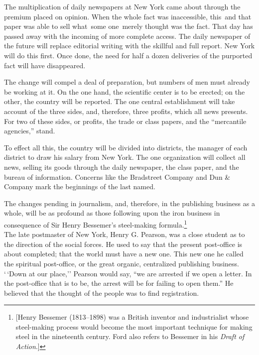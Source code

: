 \documentclass[twoside,symmetric,nobib,justified]{tufte-book}
\begin{document}
The multiplication of daily newspapers at New York came about through
the premium placed on opinion. When the whole fact was inaccessible,
this~and that paper was able to sell what~some one~merely thought was
the fact. That day has passed away with the incoming of more complete
access. The daily newspaper of the future will replace editorial writing
with the skillful and full report. New York will do this first. Once
done, the need for half a dozen deliveries of the purported fact will
have disappeared.~

The change will compel a deal of preparation, but numbers of men must
already be working at it. On the one hand, the scientific center is to
be erected; on the other, the country will be reported. The one central
establishment will take account of the three sides, and, therefore,
three profits, which all news presents. For two of these sides, or
profits, the trade or class papers, and the ``mercantile agencies,''
stand.~

To effect all this, the country will be divided into districts, the
manager of each district to draw his salary from New York. The one
organization will collect all news, selling its goods through the daily
newspaper, the class paper, and the bureau of information. Concerns like
the Bradstreet Company and Dun \& Company mark the beginnings of the
last named.~

The changes pending in journalism, and, therefore, in the publishing
business as a whole, will be as profound as those following upon the
iron business in consequence of Sir Henry Bessemer's steel-making
formula.\footnote{{[}Henry Bessemer (1813--1898) was a British inventor
  and industrialist whose steel-making process would become the most
  important technique for making steel in the nineteenth century. Ford
  also refers to Bessemer in his \emph{Draft of Action}.{]}}\\\noindent The late
postmaster of New York, Henry G. Pearson, was a close student as to the
direction of the social forces. He used to say that the present
post-office is about completed; that the world must have a new one. This
new one he called the spiritual post-office, or the great organic,
centralized publishing business. `\,`Down at our place,'' Pearson would
say, ``we are arrested if we open a letter. In the post-office that is
to be, the arrest will be for failing to open them.'' He believed that
the thought of the people was to find registration.~
\end{document}
